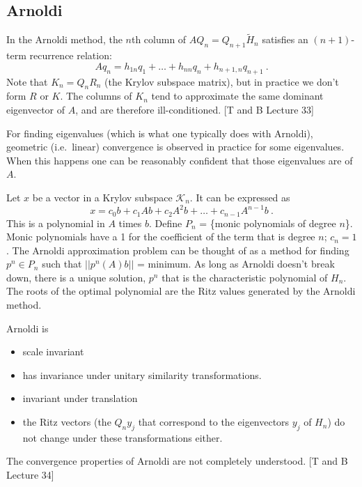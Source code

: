 \documentclass[12pt,twoside]{book}
\begin{document}
\subsection{Arnoldi}
In the Arnoldi method, the $n$th column of $AQ_{n} = Q_{n+1}\tilde{H}_{n}$ satisfies an $(n+1)$-term recurrence relation:
%
\begin{equation}
  Aq_{n} = h_{1n}q_{1} + \dots + h_{nn}q_{n} + h_{n+1,n}q_{n+1} \:.
\end{equation} 
%
Note that $K_{n} = Q_{n}R_{n}$ (the Krylov subspace matrix), but in practice we don't form $R$ or $K$. The columns of $K_{n}$ tend to approximate the same dominant eigenvector of $A$, and are therefore ill-conditioned. [T and B Lecture 33]

For finding eigenvalues (which is what one typically does with Arnoldi), geometric (i.e.\ linear) convergence is observed in practice for some eigenvalues. When this happens one can be reasonably confident that those eigenvalues are of $A$. 

Let $x$ be a vector in a Krylov subspace $\mathcal{K}_{n}$. It can be expressed as
%
\begin{equation}
  x = c_{0}b + c_{1}Ab + c_{2}A^{2}b + \dots + c_{n-1}A^{n-1}b \:.
\end{equation}
This is a polynomial in $A$ times $b$. Define $P_{n}$ = \{monic polynomials of degree $n$\}. Monic polynomials have a 1 for the coefficient of the term that is degree $n$; $c_{n} = 1$. The Arnoldi approximation problem can be thought of as a method for finding $p^{n} \in P_{n}$ such that $||p^{n}(A)b||$ = minimum. As long as Arnoldi doesn't break down, there is a unique solution, $p^{n}$ that is the characteristic polynomial of $H_{n}$. The roots of the optimal polynomial are the Ritz values generated by the Arnoldi method.

\noindent Arnoldi is
\begin{itemize}
 \item scale invariant 
 \item has invariance under unitary similarity transformations.
  \item invariant under translation
  \item the Ritz vectors (the $Q_{n}y_{j}$ that correspond to the eigenvectors $y_{j}$ of $H_{n}$) do not change under these transformations either.
\end{itemize}
The convergence properties of Arnoldi are not completely understood. [T and B Lecture 34]
\end{document}
